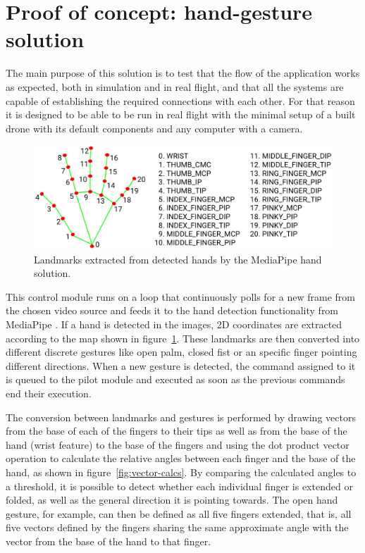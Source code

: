 \section{Proof of concept: hand-gesture solution}
\label{sec:hands}
The main purpose of this solution is to test that the flow of the application works as expected, both in simulation and in real flight, and that all the systems are capable of establishing the required connections with each other.
For that reason it is designed to be able to be run in real flight with the minimal setup of a built drone with its default components and any computer with a camera.

\begin{figure}
  \centering
  \includegraphics[width=\textwidth, keepaspectratio]{img/hand_landmarks.png}
  \caption{Landmarks extracted from detected hands by the MediaPipe hand solution.}
  \label{fig:hand-landmarks}
\end{figure}

This control module runs on a loop that continuously polls for a new frame from the chosen video source and feeds it to the hand detection functionality from MediaPipe \cite{mp-hands-paper}.
If a hand is detected in the images, 2D coordinates are extracted according to the map shown in figure~\ref{fig:hand-landmarks}.
These landmarks are then converted into different discrete gestures like open palm, closed fist or an specific finger pointing different directions.
When a new gesture is detected, the command assigned to it is queued to the pilot module and executed as soon as the previous commands end their execution.

The conversion between landmarks and gestures is performed by drawing vectors from the base of each of the fingers to their tips as well as from the base of the hand (wrist feature) to the base of the fingers and using the dot product vector operation to calculate the relative angles between each finger and the base of the hand, as shown in figure~\ref{fig:vector-calcs}.
By comparing the calculated angles to a threshold, it is possible to detect whether each individual finger is extended or folded, as well as the general direction it is pointing towards.
The open hand gesture, for example, can then be defined as all five fingers extended, that is, all five vectors defined by the fingers sharing the same approximate angle with the vector from the base of the hand to that finger.

